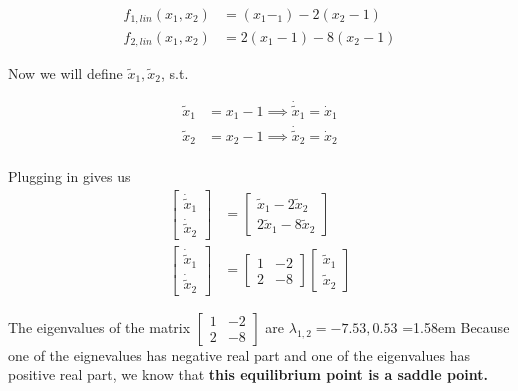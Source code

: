 \documentclass{article}
\begin{document}
  \begin{align*}
    f_{1, lin}(x_1,x_2) &= (x_1 -_1) - 2(x_2 - 1) \\
    f_{2, lin}(x_1,x_2) &= 2(x_1 - 1) - 8(x_2 - 1)
  \end{align*}

  \indent Now we will define $\tilde{x}_1, \tilde{x}_2$, s.t.

  \begin{align*}
    \tilde{x}_1 &= x_1-1 \implies \dot{\tilde{x}}_1 = \dot{x}_1 \\
    \tilde{x}_2 &= x_2-1 \implies \dot{\tilde{x}}_2 = \dot{x}_2 \\
  \end{align*}
  
  \indent Plugging in gives us
  \begin{align*}
    \begin{bmatrix}
      \dot{\tilde{x}}_1 \\
      \dot{\tilde{x}}_2
    \end{bmatrix} &=
    \begin{bmatrix}
      \tilde{x}_1 - 2\tilde{x}_2 \\
      2\tilde{x}_1 - 8\tilde{x}_2
    \end{bmatrix} \\
    \begin{bmatrix}
      \dot{\tilde{x}}_1 \\
      \dot{\tilde{x}}_2
    \end{bmatrix} &=
    \begin{bmatrix}
      1 & -2 \\
      2 & -8
    \end{bmatrix} 
    \begin{bmatrix}
      \tilde{x}_1 \\
      \tilde{x}_2
    \end{bmatrix} 
  \end{align*}


  The eigenvalues of the matrix $\begin{bmatrix}
      1 & -2 \\
      2 & -8
  \end{bmatrix}$ are $\lambda_{1,2} = -7.53, 0.53$ \newline \newline
  \hangindent=1.58em
   Because one of the eignevalues has negative real part and one of
  the eigenvalues has positive real part, we know that \textbf{this
  equilibrium point is a saddle point.} \newline \newline
  
\end{document}
